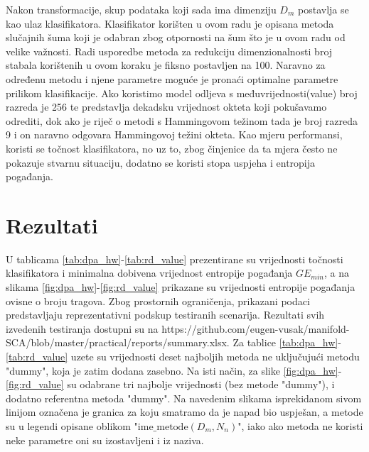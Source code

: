 \documentclass[times, utf8, diplomski]{fer}
\begin{document}
Nakon transformacije, skup podataka koji sada ima dimenziju $D_m$ postavlja se kao ulaz klasifikatora. Klasifikator korišten u ovom radu je opisana metoda slučajnih šuma koji je odabran zbog otpornosti na šum što je u ovom radu od velike važnosti. Radi usporedbe metoda za redukciju dimenzionalnosti broj stabala korištenih u ovom koraku je fiksno postavljen na 100. Naravno za određenu metodu i njene parametre moguće je pronaći optimalne parametre prilikom klasifikacije. Ako koristimo model odljeva s međuvrijednosti(value) broj razreda je 256 te predstavlja dekadsku vrijednost okteta koji pokušavamo odrediti, dok ako je riječ o metodi s Hammingovom težinom tada je broj razreda 9 i on naravno odgovara Hammingovoj težini okteta. Kao mjeru performansi, koristi se točnost klasifikatora, no uz to, zbog činjenice da ta mjera često ne pokazuje stvarnu situaciju, dodatno se koristi stopa uspjeha  i entropija pogađanja.

\section{Rezultati}

U tablicama \ref{tab:dpa_hw}-\ref{tab:rd_value} prezentirane su vrijednosti točnosti klasifikatora i minimalna dobivena vrijednost entropije pogađanja $GE_{min}$, a na slikama \ref{fig:dpa_hw}-\ref{fig:rd_value} prikazane su vrijednosti entropije pogađanja ovisne o broju tragova. Zbog prostornih ograničenja, prikazani podaci predstavljaju reprezentativni podskup testiranih scenarija. Rezultati svih izvedenih testiranja dostupni su na https://github.com/eugen-vusak/manifold-SCA/blob/master/practical/reports/summary.xlsx. Za tablice \ref{tab:dpa_hw}-\ref{tab:rd_value} uzete su vrijednosti deset najboljih metoda ne uključujući metodu "dummy", koja je zatim dodana zasebno. Na isti način, za slike \ref{fig:dpa_hw}-\ref{fig:rd_value} su odabrane tri najbolje vrijednosti (bez  metode "dummy"), i dodatno referentna metoda "dummy". Na navedenim slikama isprekidanom sivom linijom označena je granica za koju smatramo da je napad bio uspješan, a metode su u legendi opisane oblikom "$\text{ime\_metode}(D_m, N_n)$", iako ako metoda ne koristi neke parametre oni su izostavljeni i iz naziva.
\end{document}
